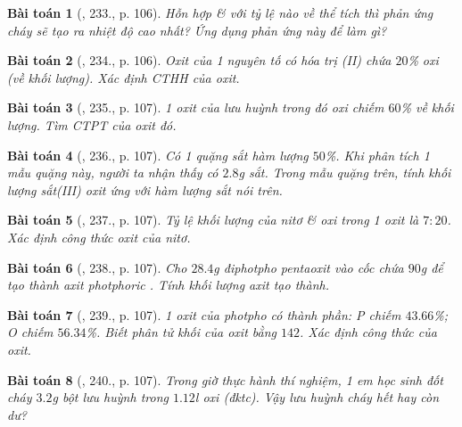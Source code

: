 \documentclass{article}
\newtheorem{baitoan}{Bài toán}
\begin{document}
\begin{baitoan}[\cite{An_400_BT_Hoa_Hoc_8_2020}, 233., p. 106]
	Hỗn hợp \emph{} \& \emph{} với tỷ lệ nào về thể tích thì phản ứng cháy sẽ tạo ra nhiệt độ cao nhất? Ứng dụng phản ứng này để làm gì?
\end{baitoan}

\begin{baitoan}[\cite{An_400_BT_Hoa_Hoc_8_2020}, 234., p. 106]
	Oxit của 1 nguyên tố có hóa trị (II) chứa $20$\% oxi (về khối lượng). Xác định CTHH của oxit.
\end{baitoan}

\begin{baitoan}[\cite{An_400_BT_Hoa_Hoc_8_2020}, 235., p. 107]
	1 oxit của lưu huỳnh trong đó oxi chiếm $60$\% về khối lượng. Tìm CTPT của oxit đó.
\end{baitoan}

\begin{baitoan}[\cite{An_400_BT_Hoa_Hoc_8_2020}, 236., p. 107]
	Có 1 quặng sắt hàm lượng $50$\%. Khi phân tích 1 mẫu quặng này, người ta nhận thấy có $2.8$\emph{g} sắt. Trong mẫu quặng trên, tính khối lượng sắt(III) oxit \emph{} ứng với hàm lượng sắt nói trên.
\end{baitoan}

\begin{baitoan}[\cite{An_400_BT_Hoa_Hoc_8_2020}, 237., p. 107]
	Tỷ lệ khối lượng của nitơ \& oxi trong 1 oxit là $7:20$. Xác định công thức oxit của nitơ.
\end{baitoan}

\begin{baitoan}[\cite{An_400_BT_Hoa_Hoc_8_2020}, 238., p. 107]
	Cho $28.4$\emph{g} điphotpho pentaoxit \emph{} vào cốc chứa $90$\emph{g} \emph{} để tạo thành axit photphoric \emph{}. Tính khối lượng axit \emph{} tạo thành.
\end{baitoan}

\begin{baitoan}[\cite{An_400_BT_Hoa_Hoc_8_2020}, 239., p. 107]
	1 oxit của photpho có thành phần: \emph{P} chiếm $43.66$\%; \emph{O} chiếm $56.34$\%. Biết phân tử khối của oxit bằng $142$. Xác định công thức của oxit.
\end{baitoan}

\begin{baitoan}[\cite{An_400_BT_Hoa_Hoc_8_2020}, 240., p. 107]
	Trong giờ thực hành thí nghiệm, 1 em học sinh đốt cháy $3.2$\emph{g} bột lưu huỳnh trong $1.12$\emph{l} oxi (đktc). Vậy lưu huỳnh cháy hết hay còn dư?
\end{baitoan}
\end{document}
